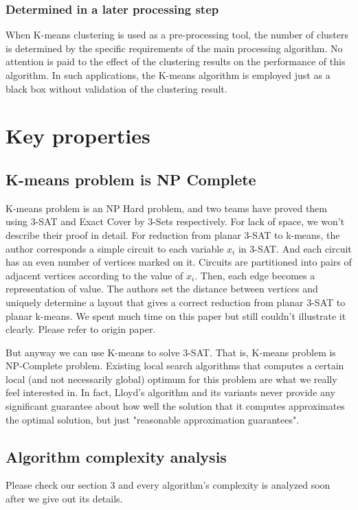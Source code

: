 \documentclass[11pt]{article}
\begin{document}
\subsubsection{Determined in a later processing step}
When K-means clustering is used as a pre-processing tool, the number of clusters is determined by the specific requirements of the main processing algorithm. No attention is paid to the effect of the clustering results on the performance of this algorithm. In such applications, the K-means algorithm is employed just as a black box without validation of the clustering result. \par

\section{Key properties}
\subsection{K-means problem is NP Complete}
K-means problem is an NP Hard problem, and two teams have proved them using 3-SAT and Exact Cover by 3-Sets respectively.\cite{npc-prove,Vattani_thehardness}  For lack of space, we won't describe their proof in detail. For reduction from planar 3-SAT to k-means, the author corresponds a simple circuit to each variable $x_i$ in 3-SAT. And each circuit has an even number of vertices marked on it. Circuits are partitioned into pairs of adjacent vertices according to the value of $x_i$. Then, each edge becomes a representation of value. The authors set the distance between vertices and uniquely determine a layout that gives a correct reduction from planar 3-SAT to planar k-means. We spent much time on this paper but still couldn't illustrate it clearly. Please refer to origin paper. \par
But anyway we can use K-means to solve 3-SAT. That is, K-means problem is NP-Complete problem. Existing local search algorithms that computes a certain local (and not necessarily global) optimum for this problem are what we really feel interested in. In fact, Lloyd’s algorithm and its variants never  provide any significant guarantee about how well the solution that it computes approximates the optimal solution, but just "reasonable approximation guarantees".

\subsection{Algorithm complexity analysis}
Please check our section 3 and every algorithm's complexity is analyzed soon after we give out its details.
\end{document}
